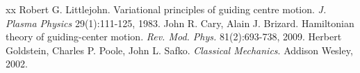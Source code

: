\documentclass{scrartcl}
\begin{document}
\begin{thebibliography}{xx}
    Robert G. Littlejohn. Variational principles of guiding centre motion. \emph{J. Plasma Physics} 29(1):111-125, 1983.
    John R. Cary, Alain J. Brizard. Hamiltonian theory of guiding-center motion. \emph{Rev. Mod. Phys.} 81(2):693-738, 2009.
    Herbert Goldstein, Charles P. Poole, John L. Safko. \textit{Classical Mechanics}. Addison Wesley, 2002.
\end{thebibliography}
\end{document}
